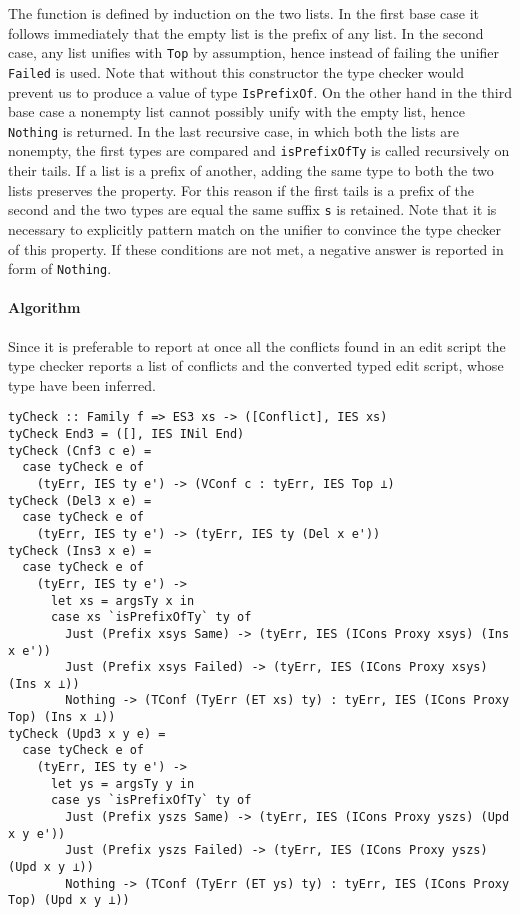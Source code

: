 \documentclass[../Thesis.tex]{subfiles}
\begin{document}
	The function is defined by induction on the two lists.
	In the first base case it follows immediately that the empty list is
	the prefix of any list. In the second case, any list unifies
	with \texttt{Top} by assumption, hence instead of failing
	the unifier \texttt{Failed} is used. Note that without this constructor
	the type checker would prevent us to produce a value of type
	\texttt{IsPrefixOf}.
	On the other hand in the third base case a nonempty list cannot possibly
	unify with the empty list, hence \texttt{Nothing} is returned.
	In the last recursive case, in which both the lists are nonempty, the first 
	types are compared and \texttt{isPrefixOfTy} is called recursively
	on their tails. If a list is a prefix of another, adding the same type to both
	the two lists preserves the property. For this reason if the first tails is a 
	prefix of the second and the two types are equal the same suffix
	\texttt{s} is retained. Note that it is necessary to explicitly pattern match
	on the unifier to convince the type checker of this property.
	If these conditions are not met, a negative answer is reported in form of 
	\texttt{Nothing}.	
		
	\paragraph{Algorithm}
	Since it is preferable to report at once all the conflicts found in an edit script
	the type checker reports a list of conflicts and the converted typed edit
	script, whose type have been inferred.
	
\begin{verbatim}
tyCheck :: Family f => ES3 xs -> ([Conflict], IES xs)
tyCheck End3 = ([], IES INil End)
tyCheck (Cnf3 c e) =
  case tyCheck e of
    (tyErr, IES ty e') -> (VConf c : tyErr, IES Top ⊥)
tyCheck (Del3 x e) =
  case tyCheck e of
    (tyErr, IES ty e') -> (tyErr, IES ty (Del x e'))
tyCheck (Ins3 x e) =
  case tyCheck e of
    (tyErr, IES ty e') ->
      let xs = argsTy x in
      case xs `isPrefixOfTy` ty of
        Just (Prefix xsys Same) -> (tyErr, IES (ICons Proxy xsys) (Ins x e'))
        Just (Prefix xsys Failed) -> (tyErr, IES (ICons Proxy xsys) (Ins x ⊥))
        Nothing -> (TConf (TyErr (ET xs) ty) : tyErr, IES (ICons Proxy Top) (Ins x ⊥))
tyCheck (Upd3 x y e) =
  case tyCheck e of
    (tyErr, IES ty e') ->
      let ys = argsTy y in
      case ys `isPrefixOfTy` ty of
        Just (Prefix yszs Same) -> (tyErr, IES (ICons Proxy yszs) (Upd x y e'))
        Just (Prefix yszs Failed) -> (tyErr, IES (ICons Proxy yszs) (Upd x y ⊥))
        Nothing -> (TConf (TyErr (ET ys) ty) : tyErr, IES (ICons Proxy Top) (Upd x y ⊥))
\end{verbatim}
\end{document}
